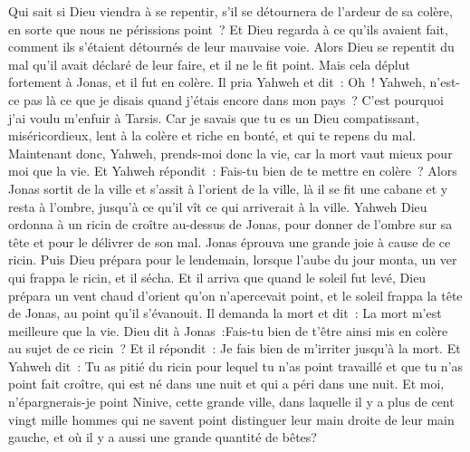\begin{multicols}{2}
Qui sait si Dieu viendra à se repentir, s'il se détournera de l'ardeur de sa colère, en sorte que nous ne périssions point~?
Et Dieu regarda à ce qu'ils avaient fait, comment ils s'étaient détournés de leur mauvaise voie. Alors Dieu se repentit du mal qu'il avait déclaré de leur faire, et il ne le fit point.
\VerseOne{}Mais cela déplut fortement à Jonas, et il fut en colère.
Il pria Yahweh et dit~: Oh~! Yahweh, n'est-ce pas là ce que je disais quand j'étais encore dans mon pays~? C'est pourquoi j'ai voulu m'enfuir à Tarsis. Car je savais que tu es un Dieu compatissant, miséricordieux, lent à la colère et riche en bonté, et qui te repens du mal.
Maintenant donc, Yahweh, prends-moi donc la vie, car la mort vaut mieux pour moi que la vie.
Et Yahweh répondit~: Fais-tu bien de te mettre en colère~?
Alors Jonas sortit de la ville et s'assit à l'orient de la ville, là il se fit une cabane et y resta à l'ombre, jusqu'à ce qu'il vît ce qui arriverait à la ville.
Yahweh Dieu ordonna à un ricin de croître au-dessus de Jonas, pour donner de l'ombre sur sa tête et pour le délivrer de son mal. Jonas éprouva une grande joie à cause de ce ricin.
Puis Dieu prépara pour le lendemain, lorsque l'aube du jour monta, un ver qui frappa le ricin, et il sécha.
Et il arriva que quand le soleil fut levé, Dieu prépara un vent chaud d'orient qu'on n'apercevait point, et le soleil frappa la tête de Jonas, au point qu'il s'évanouit. Il demanda la mort et dit~: La mort m'est meilleure que la vie.
Dieu dit à Jonas~:Fais-tu bien de t'être ainsi mis en colère au sujet de ce ricin~? Et il répondit~: Je fais bien de m'irriter jusqu'à la mort.
Et Yahweh dit~: Tu as pitié du ricin pour lequel tu n'as point travaillé et que tu n'as point fait croître, qui est né dans une nuit et qui a péri dans une nuit.
Et moi, n'épargnerais-je point Ninive, cette grande ville, dans laquelle il y a plus de cent vingt mille hommes qui ne savent point distinguer leur main droite de leur main gauche, et où il y a aussi une grande quantité de bêtes?
\PPE{}
\end{multicols}
